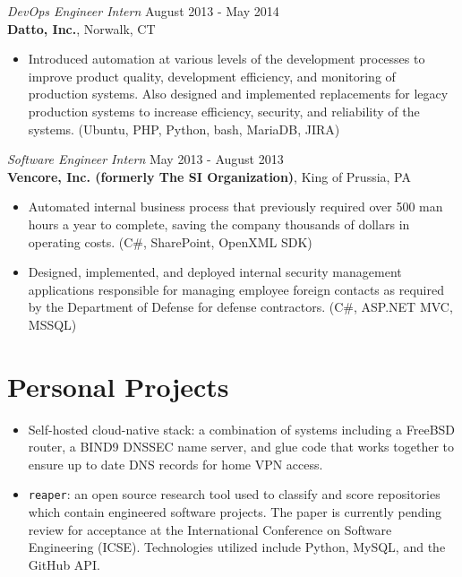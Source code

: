 \documentclass[margin]{res}
\begin{document}
\begin{resume}
{\sl DevOps Engineer Intern} \hfill August 2013 - May 2014 \\
\textbf{Datto, Inc.}, Norwalk, CT
\begin{itemize}
    \item[] Introduced automation at various levels of the development
          processes to improve product quality, development efficiency, and
          monitoring of production systems. Also designed and implemented
          replacements for legacy production systems to increase efficiency,
          security, and reliability of the systems.
          (Ubuntu, PHP, Python, bash, MariaDB, JIRA)
\end{itemize}
 
{\sl Software Engineer Intern} \hfill May 2013 - August 2013 \\
\textbf{Vencore, Inc. (formerly The SI Organization)}, King of Prussia, PA
\begin{itemize} 
    \item[] Automated internal business process that previously required over
          500 man hours a year to complete, saving the company thousands of
          dollars in operating costs.
          (C\#, SharePoint, OpenXML SDK)
    \item[] Designed, implemented, and deployed internal security management
          applications responsible for managing employee foreign contacts as
          required by the Department of Defense for defense contractors.
          (C\#, ASP.NET MVC, MSSQL)
\end{itemize} 

\section{Personal Projects}

\begin{itemize}
    \item Self-hosted cloud-native stack: a combination of systems including a FreeBSD
          router, a BIND9 DNSSEC name server, and glue code that works together
          to ensure up to date DNS records for home VPN access.
    \item \texttt{reaper}: an open source research tool used to classify and
          score repositories which contain engineered software projects. The
          paper is currently pending review for acceptance at the International
          Conference on Software Engineering (ICSE). Technologies utilized
          include Python, MySQL, and the GitHub API.
\end{itemize}

\end{resume}
\end{document}
